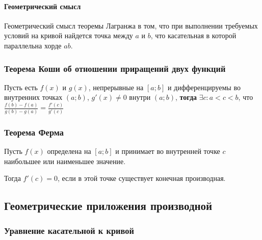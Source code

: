 \documentclass{article}
\begin{document}
\begin{flushleft}
\paragraph{Геометрический смысл} Геометрический смысл теоремы Лагранжа в том, что при выполнении требуемых условий на кривой найдется точка между $a$ и $b$, что касательная в которой параллельна хорде $ab$.

\subsubsection{Теорема Коши об отношении приращений двух функций}

Пусть есть $f(x)$ и $g(x)$, непрерывные на $[ a; b ]$ и дифференцируемы во внутренних точках $(a; b)$, $g'(x) \ne 0$ внутри $(a; b)$, \textbf{тогда} $\exists c: a < c < b$, что $\frac{f(b) - f(a)}{g(b) - g(a)} = \frac{f'(c)}{g'(c)}$

\subsubsection{Теорема Ферма}

Пусть $f(x)$ определена на $[a; b]$ и принимает во внутренней точке $c$ наибольшее или наименьшее значение.

Тогда $f'(c) = 0$, если в этой точке существует конечная производная.

\end{flushleft}

\subsection{Геометрические приложения производной}

\subsubsection{Уравнение касательной к кривой}
\end{document}
